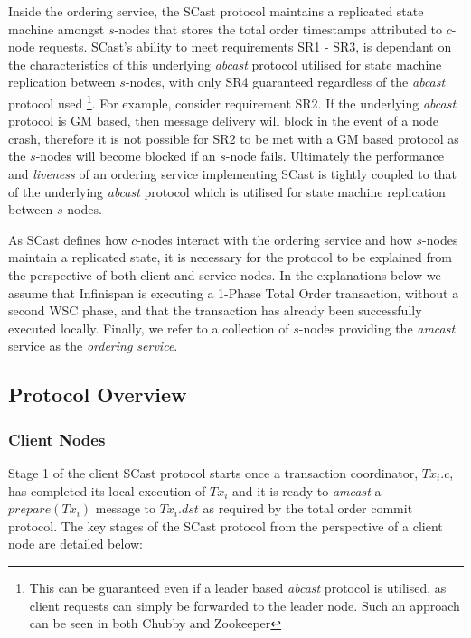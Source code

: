 Inside the ordering service, the \textsf{SCast} protocol maintains a replicated state machine amongst $s$-nodes that stores the total order timestamps attributed to $c$-node requests.  \textsf{SCast}'s ability to meet requirements SR1 - SR3, is dependant on the characteristics of this underlying \emph{abcast} protocol utilised  for state machine replication between $s$-nodes, with only SR4 guaranteed regardless of the \emph{abcast} protocol used \footnote{This can be guaranteed even if a leader based \emph{abcast} protocol is utilised, as client requests can simply be forwarded to the leader node.  Such an approach can be seen in both Chubby and Zookeeper}.  For example, consider requirement SR2.  If the underlying \emph{abcast} protocol is GM based, then message delivery will block in the event of a node crash, therefore it is not possible for SR2 to be met with a GM based protocol as the $s$-nodes will become blocked if an $s$-node fails.  Ultimately the performance and \emph{liveness} of an ordering service implementing \textsf{SCast} is tightly coupled to that of the underlying \emph{abcast} protocol which is utilised for state machine replication between $s$-nodes.  

As \textsf{SCast} defines how $c$-nodes interact with the ordering service and how $s$-nodes maintain a replicated state, it is necessary for the protocol to be explained from the perspective of both client and service nodes.  In the explanations below we assume that Infinispan is executing a 1-Phase Total Order transaction, without a second WSC phase, and that the transaction has already been successfully executed locally.  Finally, we refer to a collection of $s$-nodes providing the \emph{amcast} service as the \emph{ordering service}.  
    
    \subsection{Protocol Overview} \label{sec:scast_overview}
        \subsubsection*{Client Nodes}
    Stage 1 of the client \textsf{SCast} protocol starts once a transaction coordinator, $Tx_i.c$, has completed its local execution of $Tx_i$ and it is ready to \emph{amcast} a $prepare(Tx_i)$ message to $Tx_i.dst$ as required by the total order commit protocol.  The key stages of the \textsf{SCast} protocol from the perspective of a client node are detailed below:
    
